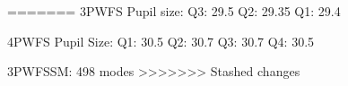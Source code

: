 





=======
3PWFS Pupil size:
Q3: 29.5
Q2: 29.35
Q1: 29.4

4PWFS Pupil Size:
Q1: 30.5
Q2: 30.7
Q3: 30.7
Q4: 30.5

3PWFSSM: 498 modes
>>>>>>> Stashed changes
